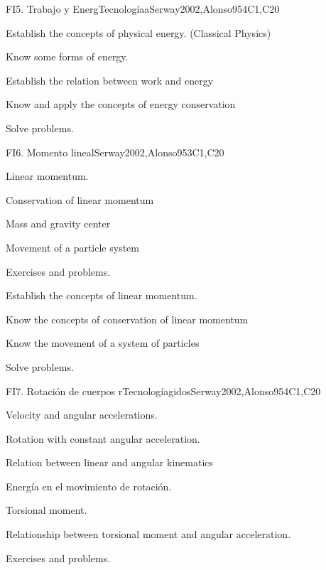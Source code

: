 \begin{syllabus}
\begin{unit}{FI5. Trabajo y EnergTecnologíaa}{}{Serway2002,Alonso95}{4}{C1,C20}
   \begin{learningoutcomes}
      \item Establish the concepts of physical energy. (Classical Physics)
      \item Know some forms of energy.
      \item Establish the relation between work and energy
      \item Know and apply the concepts of energy conservation
      \item Solve problems.
   \end{learningoutcomes}
\end{unit}

\begin{unit}{FI6. Momento lineal}{}{Serway2002,Alonso95}{3}{C1,C20}
\begin{topics}
      \item Linear momentum.
      \item Conservation of linear momentum
      \item Mass and gravity center
      \item Movement of a particle system
      \item Exercises and problems.
  \end{topics}

   \begin{learningoutcomes}
      \item Establish the concepts of linear momentum.
      \item Know the concepts of conservation of linear momentum
      \item Know the movement of a system of particles
      \item Solve problems.
   \end{learningoutcomes}
\end{unit}

\begin{unit}{FI7. Rotación de cuerpos rTecnologíagidos}{}{Serway2002,Alonso95}{4}{C1,C20}
\begin{topics}
      \item Velocity and angular accelerations.
      \item Rotation with constant angular acceleration.
      \item Relation between linear and angular kinematics
      \item Energía en el movimiento de rotación.
      \item Torsional moment.
      \item Relationship between torsional moment and angular acceleration.
      \item Exercises and problems.
   \end{topics}


\end{unit}
\end{syllabus}
